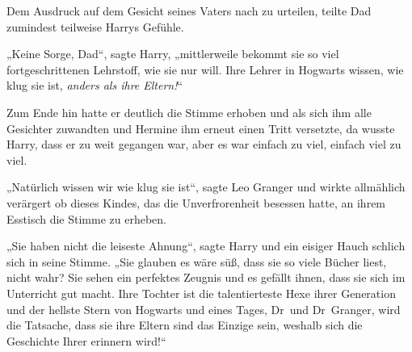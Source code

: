 Dem Ausdruck auf dem Gesicht seines Vaters nach zu urteilen, teilte Dad zumindest teilweise Harrys Gefühle.

„Keine Sorge, Dad“, sagte Harry, „mittlerweile bekommt sie so viel fortgeschrittenen Lehrstoff, wie sie nur will. Ihre Lehrer in Hogwarts wissen, wie klug sie ist, \emph{anders als ihre Eltern!}“

Zum Ende hin hatte er deutlich die Stimme erhoben und als sich ihm alle Gesichter zuwandten und Hermine ihm erneut einen Tritt versetzte, da wusste Harry, dass er zu weit gegangen war, aber es war einfach zu viel, einfach viel zu viel.

„Natürlich wissen wir wie klug sie ist“, sagte Leo Granger und wirkte allmählich verärgert ob dieses Kindes, das die Unverfrorenheit besessen hatte, an ihrem Esstisch die Stimme zu erheben.

„Sie haben nicht die leiseste Ahnung“, sagte Harry und ein eisiger Hauch schlich sich in seine Stimme.
„Sie glauben es wäre süß, dass sie so viele Bücher liest, nicht wahr? Sie sehen ein perfektes Zeugnis und es gefällt ihnen, dass sie sich im Unterricht gut macht. Ihre Tochter ist die talentierteste Hexe ihrer Generation und der hellste Stern von Hogwarts und eines Tages, Dr~und Dr~Granger, wird die Tatsache, dass sie ihre Eltern sind das Einzige sein, weshalb sich die Geschichte Ihrer erinnern wird!“

